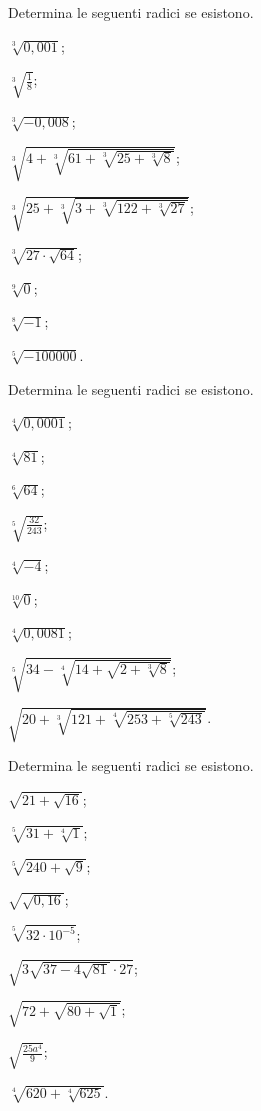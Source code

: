 \begin{esercizio}[\Ast]
 \label{ese:2.7}
Determina le seguenti radici se esistono.
 \begin{multicols}{2}
 \begin{enumeratea}
 \item $\sqrt[3]{0,001}$;
 \item $\sqrt[3]{\frac 1 8}$;
 \item $\sqrt[3]{-0,008}$;
 \item $\sqrt[3]{4+\sqrt[3]{61+\sqrt[3]{25+\sqrt[3]8}}}$;
 \item $\sqrt[3]{25+\sqrt[3]{3+\sqrt[3]{122+\sqrt[3]{27}}}}$;
 \item $\sqrt[3]{27\cdot \sqrt{64}}$;
 \item $\sqrt[9]0$;
 \item $\sqrt[8]{-1}$;
 \item $\sqrt[5]{-100000}$.
 \end{enumeratea}
 \end{multicols}
\end{esercizio}

\begin{esercizio}[\Ast]
 \label{ese:2.8}
Determina le seguenti radici se esistono.
 \begin{multicols}{2}
 \begin{enumeratea}
 \item $\sqrt[4]{0,0001}$;
 \item $\sqrt[4]{81}$;
 \item $\sqrt[6]{64}$;
 \item $\sqrt[5]{\frac{32}{243}}$;
 \item $\sqrt[4]{-4}$;
 \item $\sqrt[10]0$;
 \item $\sqrt[4]{0,0081}$;
 \item $\sqrt[5]{34-\sqrt[4]{14+\sqrt{2+\sqrt[3]8}}}$;
 \item $\sqrt{20+\sqrt[3]{121+\sqrt[4]{253+\sqrt[5]{243}}}}$.
 \end{enumeratea}
 \end{multicols}
\end{esercizio}

\begin{esercizio}[\Ast]
\label{ese:2.9}
Determina le seguenti radici se esistono.
 \begin{multicols}{3}
 \begin{enumeratea}
 \item $\sqrt{21+\sqrt{16}}$;
 \item $\sqrt[5]{31+\sqrt[4]1}$;
 \item $\sqrt[5]{240+\sqrt 9}$;
 \item $\sqrt{\sqrt{0,16}}$;
 \item $\sqrt[5]{32\cdot 10^{-5}}$;
 \item $\sqrt{3\sqrt{37-4\sqrt{81}}\cdot 27}$;
 \item $\sqrt{72+\sqrt{80+\sqrt 1}}$;
 \item $\sqrt{\frac{25a^4} 9}$;
 \item $\sqrt[4]{620+\sqrt[4]{625}}$.
 \end{enumeratea}
 \end{multicols}
\end{esercizio}

